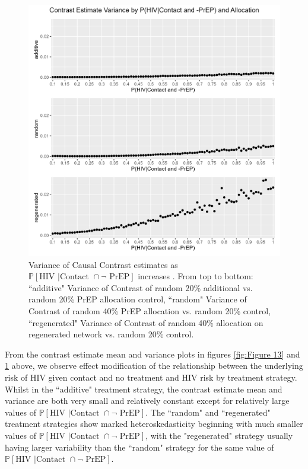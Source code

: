 \documentclass{article}
\theoremstyle{definition}
\begin{document}
\begin{figure}[H]
    \centering
    \includegraphics[width=\linewidth]{Figures/p1 Variance plots.png}
    \caption{Variance of Causal Contrast estimates as $\mathbb{P}\left[\text{HIV } \vert \text {Contact } \cap \neg \text{ PrEP}\right]$ increases .  From top to bottom: ``additive" Variance of Contrast of random 20\% additional vs. random 20\% PrEP allocation control, ``random" Variance of Contrast of random 40\% PrEP allocation vs. random 20\% control, ``regenerated" Variance of Contrast of random 40\% allocation on regenerated network vs. random 20\% control.}
    \label{fig:Figure 14}
\end{figure}
From the contrast estimate mean and variance plots in figures \ref{fig:Figure 13} and \ref{fig:Figure 14} above, we observe effect modification of the relationship between the underlying risk of HIV given contact and no treatment and HIV risk by treatment strategy. Whilst in the ``additive" treatment strategy, the contrast estimate mean and variance are both very small and relatively constant except for relatively large values of $\mathbb{P}\left[\text{HIV } \vert \text {Contact } \cap \neg \text{ PrEP}\right]$. The ``random" and ``regenerated" treatment strategies show marked heteroskedasticity beginning with much smaller values of $\mathbb{P}\left[\text{HIV } \vert \text {Contact } \cap \neg \text{ PrEP}\right]$, with the "regenerated" strategy usually having larger variability than the ``random" strategy for the same value of $\mathbb{P}\left[\text{HIV } \vert \text {Contact } \cap \neg \text{ PrEP}\right]$.  
\end{document}

